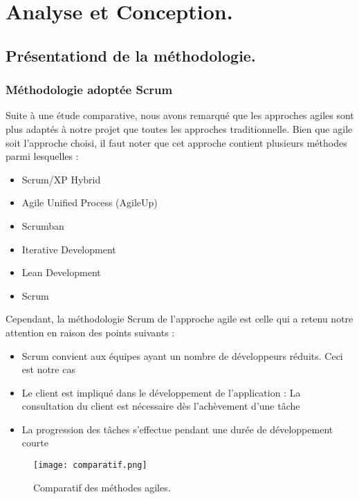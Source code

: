 \chapter{Analyse et Conception.}     %
\thispagestyle{fancy}

\section{Présentationd de la méthodologie.} 

\subsection{Méthodologie adoptée Scrum}

Suite à une étude comparative, nous avons remarqué que les approches agiles sont plus adaptés à notre projet que toutes les approches traditionnelle. Bien que agile soit l’approche choisi, il faut noter que cet approche contient plusieurs méthodes parmi lesquelles :

\begin{itemize}[label=\textbullet, font=\LARGE \color{blue}] 
	\item  Scrum/XP Hybrid
	\item  Agile Unified Process (AgileUp)
	\item  Scrumban
	\item  Iterative Development
	\item  Lean Development
	\item  Scrum
\end{itemize}

Cependant, la méthodologie Scrum de l’approche agile est celle qui a retenu notre attention en raison des points suivants :

\begin{itemize}[label=\textbullet, font=\LARGE \color{blue}] 
	\item  Scrum convient aux équipes ayant un nombre de développeurs réduits. Ceci est notre cas
	\item  Le client est impliqué dans le développement de l’application : La consultation du client est nécessaire dès l’achèvement d’une tâche
	\item  La progression des tâches s’effectue pendant une durée de développement courte
\end{itemize}

\begin{figure}[H]
	\centering
	\texttt{[image: comparatif.png]}
	\caption{Comparatif des méthodes agiles.}
	\label{fig:sp0}
\end{figure}

